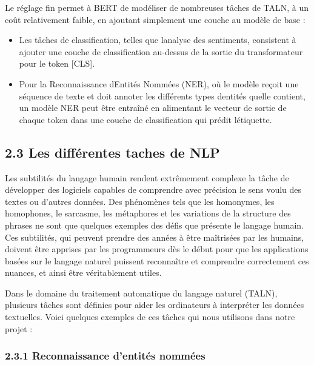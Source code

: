 \documentclass[
]{article}
\begin{document}
Le réglage fin permet à BERT de modéliser de nombreuses tâches de TALN,
à un coût relativement faible, en ajoutant simplement une couche au
modèle de base :

\begin{itemize}
\item
  Les tâches de classification, telles que l\textquotesingle analyse des
  sentiments, consistent à ajouter une couche de classification
  au-dessus de la sortie du transformateur pour le token {[}CLS{]}.
\item
  Pour la Reconnaissance d\textquotesingle Entités Nommées (NER), où le
  modèle reçoit une séquence de texte et doit annoter les différents
  types d\textquotesingle entités qu\textquotesingle elle contient, un
  modèle NER peut être entraîné en alimentant le vecteur de sortie de
  chaque token dans une couche de classification qui prédit
  l\textquotesingle étiquette.
\end{itemize}

\subsection{2.3 Les différentes taches de
NLP}\label{les-diffuxe9rentes-taches-de-nlp}

Les subtilités du langage humain rendent extrêmement complexe la tâche
de développer des logiciels capables de comprendre avec précision le
sens voulu des textes ou d'autres données. Des phénomènes tels que les
homonymes, les homophones, le sarcasme, les métaphores et les variations
de la structure des phrases ne sont que quelques exemples des défis que
présente le langage humain. Ces subtilités, qui peuvent prendre des
années à être maîtrisées par les humains, doivent être apprises par les
programmeurs dès le début pour que les applications basées sur le
langage naturel puissent reconnaître et comprendre correctement ces
nuances, et ainsi être véritablement utiles.

Dans le domaine du traitement automatique du langage naturel (TALN),
plusieurs tâches sont définies pour aider les ordinateurs à interpréter
les données textuelles. Voici quelques exemples de ces tâches qui nous
utilisons dans notre projet :

\subsubsection{2.3.1 Reconnaissance d'entités
nommées}\label{reconnaissance-dentituxe9s-nommuxe9es}
\end{document}
